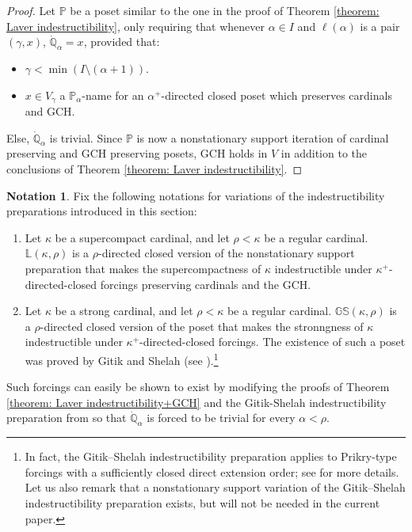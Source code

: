 \documentclass[11pt]{amsart}
\theoremstyle{definition}
\newtheorem{notation}[theorem]{Notation}
\theoremstyle{remark}
\newcommand\<{{<}}
\newcommand{\po}{\mathbb{P}}
\newcommand{\qo}{\mathbb{Q}}
\begin{document}
    \begin{proof}
        Let $\po$ be a poset similar to the one in the proof of Theorem \ref{theorem: Laver indestructibility}, only requiring that whenever $\alpha\in I$ and $\ell(\alpha)$ is a pair $(\gamma,x)$, $\dot{\qo}_\alpha = x$, provided that:
        \begin{itemize}
            \item  $\gamma< \min(I\setminus (\alpha+1))$.
            \item $x\in V_\gamma$ a $\po_\alpha$-name for an $\alpha^+$-directed closed poset which preserves cardinals and GCH.
        \end{itemize}
        Else, $\dot{\qo}_\alpha$ is trivial. Since $\po$ is now a nonstationary support iteration of cardinal preserving and GCH preserving posets, GCH holds in $V$ in addition to the conclusions of Theorem \ref{theorem: Laver indestructibility}.
        \end{proof}

  
     \begin{notation}\label{notation: Laver}
        Fix the following notations for variations of the indestructibility preparations introduced in this section:
     \begin{enumerate}
        \item Let $\kappa$ be a supercompact cardinal, and let $\rho<\kappa$ be a regular cardinal. $\mathbb{L}(\kappa,\rho)$ is a $\rho$-directed closed version of the nonstationary support preparation that makes the supercompactness of $\kappa$ indestructible under $\kappa^+$-directed-closed forcings preserving cardinals and the GCH.
        \item Let $\kappa$ be a strong cardinal, and let $\rho<\kappa$ be a regular cardinal. $\mathbb{GS}(\kappa,\rho)$ is a $\rho$-directed closed version of the poset that makes the stronngness of $\kappa$ indestructible under $\kappa^+$-directed-closed forcings. The existence of such a poset was proved by Gitik and Shelah (see \cite{GitikShelah}).\footnote{In fact, the Gitik–Shelah indestructibility preparation applies to Prikry-type forcings with a sufficiently closed direct extension order; see \cite{GitikShelah} for more details. Let us also remark that a nonstationary support variation of the Gitik–Shelah indestructibility preparation exists, but will not be needed in the current paper.} 
     \end{enumerate}
     Such forcings can easily be shown to exist by modifying the proofs of Theorem \ref{theorem: Laver indestructibility+GCH} and the Gitik-Shelah indestructibility preparation from \cite{GitikShelah} so that $\dot{\qo}_\alpha$ is forced to be trivial for every $\alpha<\rho$.
   
    \end{notation}
    
\end{document}
